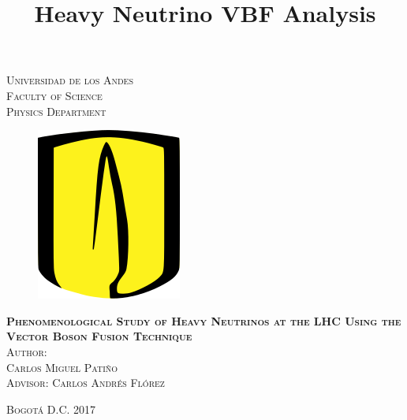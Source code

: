 \documentclass[11pt]{book}
\begin{document}

\title{Heavy Neutrino VBF Analysis} %

\begin{titlepage}
\begin{center}

\textsc{\Large Universidad de los Andes}\\[3em]

\textsc{\large Faculty of Science}\\[1em]

\textsc{\large Physics Department} \\[1em]

\begin{figure}[H]
\begin{center}
\includegraphics[scale = 0.4]{logo-uniandes.png}
\end{center}
\end{figure}

\vspace{0.5em}

\textsc{\huge \textbf{Phenomenological Study of Heavy Neutrinos at the LHC Using the Vector Boson Fusion Technique}}\\[4em]

\textsc{Author:}\\[1em]

\textsc{\Large Carlos Miguel Patiño}\\[1em]

\textsc{\large Advisor: Carlos Andrés Flórez}

\end{center}

\vspace*{\fill}
\textsc{Bogotá D.C. \hspace*{\fill} 2017}

\end{titlepage}
\end{document}
